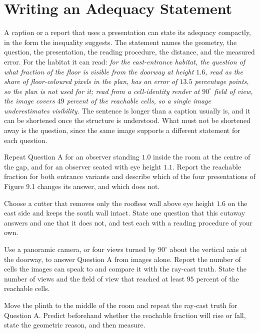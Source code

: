 \section{Writing an Adequacy Statement}

A caption or a report that uses a presentation can state its adequacy compactly, in the form the inequality suggests. The statement names the geometry, the question, the presentation, the reading procedure, the distance, and the measured error. For the habitat it can read: \emph{for the east-entrance habitat, the question of what fraction of the floor is visible from the doorway at height $1.6$, read as the share of floor-coloured pixels in the plan, has an error of $13.5$ percentage points, so the plan is not used for it; read from a cell-identity render at $90^\circ$ field of view, the image covers $49$ percent of the reachable cells, so a single image underestimates visibility.} The sentence is longer than a caption usually is, and it can be shortened once the structure is understood. What must not be shortened away is the question, since the same image supports a different statement for each question.

\begin{exercise}
Repeat Question A for an observer standing $1.0$ inside the room at the centre of the gap, and for an observer seated with eye height $1.1$. Report the reachable fraction for both entrance variants and describe which of the four presentations of Figure 9.1 changes its answer, and which does not.
\end{exercise}

\begin{exercise}
Choose a cutter that removes only the roofless wall above eye height $1.6$ on the east side and keeps the south wall intact. State one question that this cutaway answers and one that it does not, and test each with a reading procedure of your own.
\end{exercise}

\begin{exercise}
Use a panoramic camera, or four views turned by $90^\circ$ about the vertical axis at the doorway, to answer Question A from images alone. Report the number of cells the images can speak to and compare it with the ray-cast truth. State the number of views and the field of view that reached at least $95$ percent of the reachable cells.
\end{exercise}

\begin{exercise}
Move the plinth to the middle of the room and repeat the ray-cast truth for Question A. Predict beforehand whether the reachable fraction will rise or fall, state the geometric reason, and then measure.
\end{exercise}
